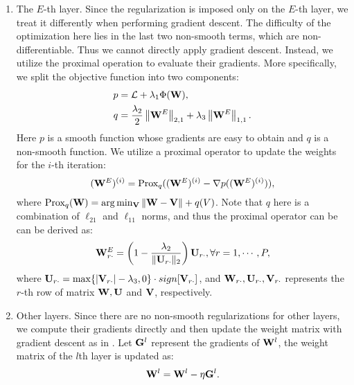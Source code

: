 \documentclass[journal]{IEEEtran}
\begin{document}
\begin{enumerate}
    \item The $E$-th layer. Since the regularization is imposed only on the $E$-th layer, we treat it differently when performing gradient descent. The difficulty of the optimization here lies in the last two non-smooth terms, which are non-differentiable. Thus we cannot directly apply gradient descent. Instead, we utilize the proximal operation to evaluate their gradients. More specifically, we split the objective function into two components:
        \begin{align*}
            p &= \mathcal{L} +  \lambda_1 \Phi({\bf W}), \\
            q &= \frac{\lambda_{2}}{2}\left \| {\bf W}^{E} \right \|_{2,1}+\lambda_{3}\left \| {\bf W}^{E} \right \|_{1,1}.
        \end{align*}
        Here $p$ is a smooth function whose gradients are easy to obtain and $q$ is a non-smooth function. We utilize a proximal operator to update the weights for the $i$-th iteration:
        \begin{equation*}
            ({\bf W}^E)^{(i)} = \text{Prox}_q (({\bf W}^E)^{(i)} - \nabla p(({\bf W}^E)^{(i)})),
        \end{equation*}
        where $\text{Prox}_q({\bf W}) = \arg\min_{\bf V} \|{\bf W}-{\bf V}\| + q(V)$. Note that $q$ here is a combination of $\ell_{21}$ and $\ell_{11}$ norms, and thus the proximal operator can be can be derived as:
        \begin{equation}
        \label{eq:sol}
            {\bf W}^E_{r\cdot} = \left( 1- \frac{\lambda_2}{\|{\bf U}_{r\cdot}\|_2} \right) {\bf U}_{r\cdot}, \forall r = 1,\cdots, P,
        \end{equation}
        where ${\bf U}_{r\cdot} = \max\{|{\bf V}_{r\cdot}| - \lambda_3,0 \} \cdot sign[{\bf V}_{r\cdot}]$, and ${\bf W}_{r\cdot},{\bf U}_{r\cdot},{\bf V}_{r\cdot}$ represents the $r$-th row of matrix ${\bf W}, {\bf U}$ and ${\bf V}$, respectively.
    \item Other layers. Since there are no non-smooth regularizations for other layers, we compute their gradients directly and then update the weight matrix with gradient descent as in \cite{bengio2012practical}. Let ${\bf G}^l$ represent the gradients of ${\bf W}^l$, the weight matrix of the $l$th layer is updated as:
    \begin{equation}
    \label{eq:update}
    {\bf W}^l = {\bf W}^l - \eta {\bf G}^l.
    \end{equation}
\end{enumerate}
\end{document}
